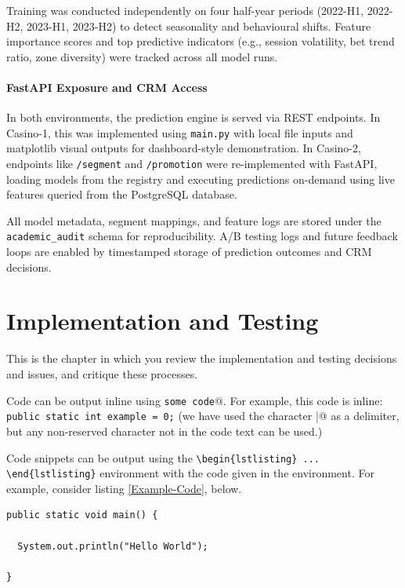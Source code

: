 \documentclass[12pt,a4paper]{report}
\begin{document}
Training was conducted independently on four half-year periods (2022-H1, 2022-H2, 2023-H1, 2023-H2) to detect seasonality and behavioural shifts. Feature importance scores and top predictive indicators (e.g., session volatility, bet trend ratio, zone diversity) were tracked across all model runs.

\subsubsection*{FastAPI Exposure and CRM Access}

In both environments, the prediction engine is served via REST endpoints. In Casino-1, this was implemented using \texttt{main.py} with local file inputs and matplotlib visual outputs for dashboard-style demonstration. In Casino-2, endpoints like \texttt{/segment} and \texttt{/promotion} were re-implemented with FastAPI, loading models from the registry and executing predictions on-demand using live features queried from the PostgreSQL database.

All model metadata, segment mappings, and feature logs are stored under the \texttt{academic\_audit} schema for reproducibility. A/B testing logs and future feedback loops are enabled by timestamped storage of prediction outcomes and CRM decisions.



\chapter{Implementation and Testing}

This is the chapter in which you review the implementation and testing decisions and issues, and critique these processes.

Code can be output inline using \verb@\lstinline|some code|@.  For example, this code is inline: \lstinline|public static int example = 0;| (we have used the character \verb@|@ as a delimiter, but any non-reserved character not in the code text can be used.)

Code snippets can be output using the \verb|\begin{lstlisting} ... \end{lstlisting}|
environment with the code given in the environment. For example, consider listing \ref{Example-Code}, below.

\begin{lstlisting}[breaklines,breakatwhitespace,caption={Example code},label=Example-Code]
public static void main() {

  System.out.println("Hello World");

}
\end{lstlisting}
\end{document}
